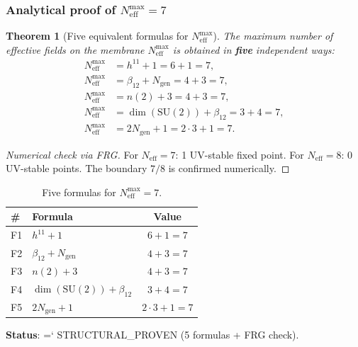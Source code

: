 \documentclass[11pt,a4paper]{article}
\newcommand{\SU}{\mathrm{SU}}
\newcommand{\Ngen}{N_{\text{gen}}}
\newcommand{\Neff}{N_{\text{eff}}}
\renewcommand{\texttt}[1]{{\ttfamily\hyphenchar\font=`\- #1}}
\newtheorem{theorem}{Theorem}[section]
\theoremstyle{definition}
\begin{document}
\subsubsection{Analytical proof of \texorpdfstring{$\Neff^{\max} = 7$}{N\_eff max = 7}}
\label{subsubsec:neff-max-analytic}

\begin{theorem}[Five equivalent formulas for $N_{\text{eff}}^{\max}$]
\label{thm:five-formulas-7-review}
The maximum number of effective fields on the membrane
$N_{\text{eff}}^{\max}$ is obtained in \textbf{five} independent
ways:
\begin{align}
    N_{\text{eff}}^{\max} &= h^{11} + 1 = 6 + 1 = 7, \\
    N_{\text{eff}}^{\max} &= \beta_{12} + \Ngen = 4 + 3 = 7, \\
    N_{\text{eff}}^{\max} &= n(2) + 3 = 4 + 3 = 7, \\
    N_{\text{eff}}^{\max} &= \dim(\SU(2)) + \beta_{12} = 3 + 4 = 7, \\
    N_{\text{eff}}^{\max} &= 2 \Ngen + 1 = 2 \cdot 3 + 1 = 7.
\end{align}
\end{theorem}

\begin{proof}[Numerical check via FRG]
For $N_{\text{eff}} = 7$: 1 UV-stable fixed point.
For $N_{\text{eff}} = 8$: 0 UV-stable points.
The boundary $7/8$ is confirmed numerically.
\end{proof}

\begin{table}[htbp]
\centering
\caption{Five formulas for $N_{\text{eff}}^{\max} = 7$.}
\label{tab:five-formulas-7}
\begin{tabular}{llc}
\toprule
\# & Formula & Value \\
\midrule
F1 & $h^{11} + 1$ & $6 + 1 = 7$ \\
F2 & $\beta_{12} + \Ngen$ & $4 + 3 = 7$ \\
F3 & $n(2) + 3$ & $4 + 3 = 7$ \\
F4 & $\dim(\SU(2)) + \beta_{12}$ & $3 + 4 = 7$ \\
F5 & $2 \Ngen + 1$ & $2 \cdot 3 + 1 = 7$ \\
\bottomrule
\end{tabular}
\end{table}

\noindent
\textbf{Status}: \texttt{STRUCTURAL\_PROVEN}
(5 formulas + FRG check).

\end{document}
